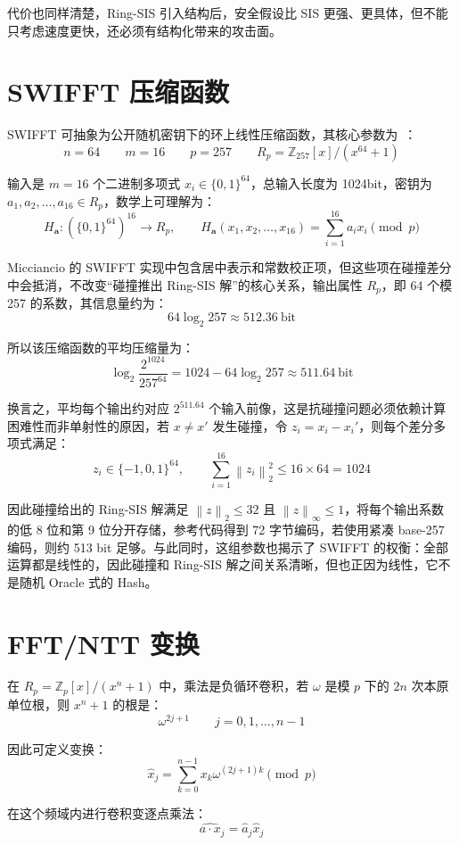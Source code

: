 \documentclass{article}
\newcommand{\norm}[1]{\left\lVert #1 \right\rVert}
\begin{document}
代价也同样清楚，Ring-SIS 引入结构后，安全假设比 SIS 更强、更具体，但不能只考虑速度更快，还必须有结构化带来的攻击面。



\section{SWIFFT 压缩函数}
SWIFFT 可抽象为公开随机密钥下的环上线性压缩函数，其核心参数为~\cite{SWIFFT08}：
\[ n=64\qquad m=16\qquad p=257\qquad R_p=\mathbb{Z}_{257}[x]/(x^{64}+1) \]

输入是 $m=16$ 个二进制多项式 $x_i\in\{0,1\}^{64}$，总输入长度为 1024bit，密钥为 $a_1,a_2,\ldots,a_{16}\in R_p$，数学上可理解为：
\[ H_{\bm{a}}:\left(\{0,1\}^{64}\right)^{16}\longrightarrow R_p,\qquad H_{\bm{a}}(x_1,x_2,\ldots,x_{16})=\sum_{i=1}^{16}a_ix_i\pmod p \]

Micciancio 的 SWIFFT 实现中包含居中表示和常数校正项，但这些项在碰撞差分中会抵消，不改变“碰撞推出 Ring-SIS 解”的核心关系，输出属性 $R_p$，即 64 个模 257 的系数，其信息量约为：
\[ 64\log_{2}257\approx512.36\ \text{bit} \]

所以该压缩函数的平均压缩量为：
\[ \log_2\dfrac{2^{1024}}{257^{64}}=1024-64\log_2 257 \approx511.64\ \text{bit} \]

换言之，平均每个输出约对应 $2^{511.64}$ 个输入前像，这是抗碰撞问题必须依赖计算困难性而非单射性的原因，若 $x\neq x'$ 发生碰撞，令 $z_i=x_i-x_i'$，则每个差分多项式满足：
\[ z_i\in\{-1,0,1\}^{64},\qquad\sum_{i=1}^{16}\norm{z_i}_2^2\leqslant16\times64=1024 \]

因此碰撞给出的 Ring-SIS 解满足 $\norm{z}_2\leqslant32$ 且 $\norm{z}_\infty\leqslant1$，将每个输出系数的低 8 位和第 9 位分开存储，参考代码得到 72 字节编码，若使用紧凑 base-257 编码，则约 513 bit 足够。与此同时，这组参数也揭示了 SWIFFT 的权衡：全部运算都是线性的，因此碰撞和 Ring-SIS 解之间关系清晰，但也正因为线性，它不是随机 Oracle 式的 Hash。



\section{FFT/NTT 变换}
在 $R_p=\mathbb{Z}_{p}[x]/(x^{n}+1)$ 中，乘法是负循环卷积，若 $\omega$ 是模 $p$ 下的 $2n$ 次本原单位根，则 $x^{n}+1$ 的根是：
\[ \omega^{2j+1}\qquad j=0,1,\ldots,n-1 \]

因此可定义变换：
\[ \widehat{x}_j=\sum_{k=0}^{n-1}x_k\omega^{(2j+1)k}\pmod p \]

在这个频域内进行卷积变逐点乘法：
\[ \widehat{a\cdot x}_j=\widehat a_j\widehat x_j \]
\end{document}

